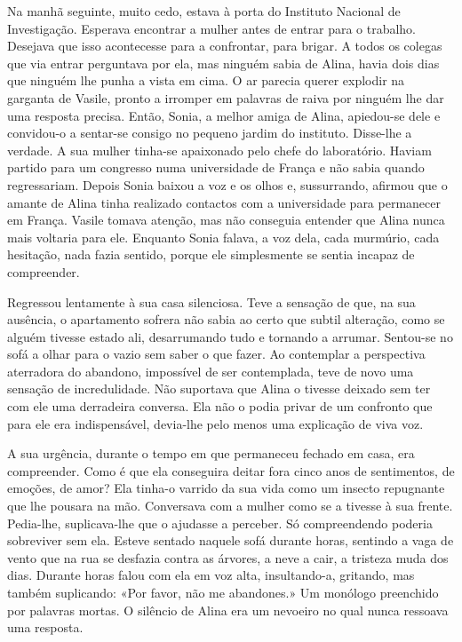 Na manhã seguinte, muito cedo, estava à porta do Instituto Nacional de
Investigação. Esperava encontrar a mulher antes de entrar para o
trabalho. Desejava que isso acontecesse para a confrontar, para brigar.
A todos os colegas que via entrar perguntava por ela, mas ninguém sabia
de Alina, havia dois dias que ninguém lhe punha a vista em cima. O ar
parecia querer explodir na garganta de Vasile, pronto a irromper em
palavras de raiva por ninguém lhe dar uma resposta precisa. Então,
Sonia, a melhor amiga de Alina, apiedou-se dele e convidou-o a sentar-se
consigo no pequeno jardim do instituto. Disse-lhe a verdade. A sua
mulher tinha-se apaixonado pelo chefe do laboratório. Haviam partido
para um congresso numa universidade de França e não sabia quando
regressariam. Depois Sonia baixou a voz e os olhos e, sussurrando, afirmou que o amante de Alina tinha realizado contactos com a universidade
para permanecer em França. Vasile tomava atenção, mas não conseguia
entender que Alina nunca mais voltaria para ele. Enquanto Sonia falava,
a voz dela, cada murmúrio, cada hesitação, nada fazia sentido, porque
ele simplesmente se sentia incapaz de compreender.

Regressou lentamente à sua casa silenciosa. Teve a sensação de que, na sua ausência, o apartamento sofrera não sabia ao certo
que subtil alteração, como se alguém tivesse estado ali, desarrumando
tudo e tornando a arrumar. Sentou-se no sofá a olhar para o vazio sem
saber o que fazer. Ao contemplar a perspectiva aterradora do abandono,
impossível de ser contemplada, teve de novo uma
sensação de incredulidade. Não suportava que Alina o tivesse deixado sem
ter com ele uma derradeira conversa. Ela não o podia privar de um
confronto que para ele era indispensável, devia-lhe pelo menos uma
explicação de viva voz.

A sua urgência, durante o tempo em que permaneceu fechado em casa, era
compreender. Como é que ela conseguira deitar fora cinco anos de
sentimentos, de emoções, de amor? Ela tinha-o varrido da sua vida como
um insecto repugnante que lhe pousara na mão. Conversava com a mulher
como se a tivesse à sua frente. Pedia-lhe, suplicava-lhe que o ajudasse a perceber. Só compreendendo poderia sobreviver sem
ela. Esteve sentado naquele sofá durante horas, sentindo a vaga de vento
que na rua se desfazia contra as árvores, a neve a cair, a tristeza muda
dos dias. Durante horas falou com ela em voz alta, insultando-a,
gritando, mas também suplicando: «Por favor, não me abandones.» Um
monólogo preenchido por palavras mortas. O silêncio de Alina era um
nevoeiro no qual nunca ressoava uma resposta.

